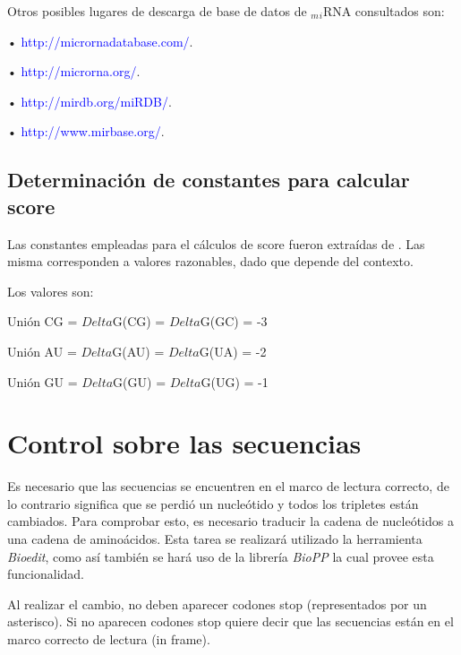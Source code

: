 \documentclass[12pt,a4paper,spanish]{article}
\begin{document}
		\par Otros posibles lugares de descarga de base de datos de $_m$$_i$RNA consultados son: 
			\par \hspace*{1cm} • \textcolor{blue}{http://micrornadatabase.com/}.
			\par \hspace*{1cm} • \textcolor{blue}{http://microrna.org/}.
			\par \hspace*{1cm} • \textcolor{blue}{http://mirdb.org/miRDB/}.
			\par \hspace*{1cm} • \textcolor{blue}{http://www.mirbase.org/}.

	\subsection{Determinación de constantes para calcular score}
		\label{zuker}
		\par Las constantes empleadas para el cálculos de score fueron extraídas de \cite{6}. Las misma corresponden a 			valores razonables, dado que depende del contexto.
		\par Los valores son:
		\begin{center}
			\par Unión CG = $Delta$G(CG) = $Delta$G(GC) = -3
			\par Unión AU = $Delta$G(AU) = $Delta$G(UA) = -2
			\par Unión GU = $Delta$G(GU) = $Delta$G(UG) = -1
		\end{center}

		

\section{Control sobre las secuencias}	
	\par Es necesario que las secuencias se encuentren en el marco de lectura correcto, de lo contrario significa que se 		perdió un nucleótido y todos los tripletes están cambiados. Para comprobar esto, es necesario traducir la cadena de 	nucleótidos a una cadena de aminoácidos. Esta tarea se realizará utilizado la herramienta \textit{Bioedit}, como así 		también se hará uso de la librería \textit{BioPP} la cual provee esta funcionalidad.	
	\par Al realizar el cambio, no deben aparecer codones stop (representados por un asterisco). Si no aparecen codones 	stop quiere decir que las secuencias están en el marco correcto de lectura (in frame).
	
\end{document}
